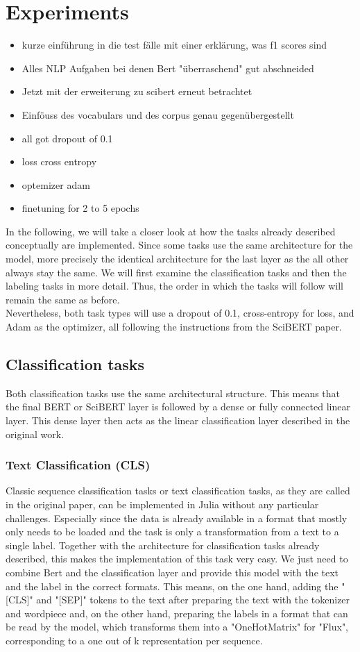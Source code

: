 \chapter{Experiments}
\label{chap:Experiments}
\color{ForestGreen}
\begin{itemize}
	\item kurze einführung in die test fälle mit einer erklärung, was f1 scores sind
	\item Alles NLP Aufgaben bei denen Bert "überraschend" gut abschneided
	\item Jetzt mit der erweiterung zu scibert erneut betrachtet
	\item Einföuss des vocabulars und des corpus genau gegenübergestellt
	\item all got dropout of 0.1
	\item loss cross entropy
	\item optemizer adam
	\item finetuning for 2 to 5 epochs 
\end{itemize}
\color{black}
In the following, we will take a closer look at how the tasks already described conceptually are implemented. Since some tasks use the same architecture for the model, more precisely the identical architecture for the last layer as the all other always stay the same. We will first examine the classification tasks and then the labeling tasks in more detail. Thus, the order in which the tasks will follow will remain the same as before.\\
Nevertheless, both task types will use a dropout of 0.1, cross-entropy for loss, and Adam as the optimizer, all following the instructions from the SciBERT paper.

\section{Classification tasks}
Both classification tasks use the same architectural structure. This means that the final BERT or SciBERT layer is followed by a dense or fully connected linear layer. This dense layer then acts as the linear classification layer described in the original work. 
\subsection{Text Classification (CLS)}
Classic sequence classification tasks or text classification tasks, as they are called in the original paper, can be implemented in Julia without any particular challenges. Especially since the data is already available in a format that mostly only needs to be loaded and the task is only a transformation from a text to a single label. Together with the architecture for classification tasks already described, this makes the implementation of this task very easy. We just need to combine Bert and the classification layer and provide this model with the text and the label in the correct formats. This means, on the one hand, adding the "[CLS]" and "[SEP]" tokens to the text after preparing the text with the tokenizer and wordpiece and, on the other hand, preparing the labels in a format that can be read by the model, which transforms them into a "OneHotMatrix" for "Flux", corresponding to a one out of k representation per sequence.
